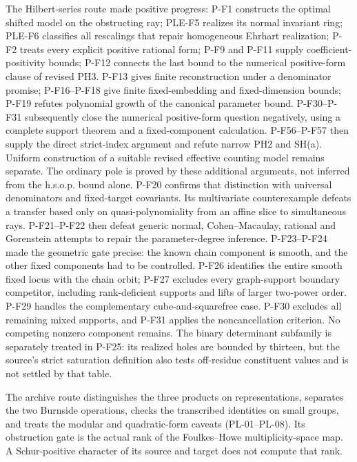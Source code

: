 The Hilbert-series route made positive progress: P-F1 constructs the
optimal shifted model on the obstructing ray; PLE-F5 realizes its normal
invariant ring; PLE-F6 classifies all rescalings that repair homogeneous
Ehrhart realization; P-F2 treats every explicit positive rational form;
P-F9 and P-F11 supply coefficient-positivity bounds; P-F12 connects the
last bound to the numerical positive-form clause of revised PH3.
P-F13 gives finite reconstruction under a denominator promise;
P-F16--P-F18 give finite fixed-embedding and fixed-dimension bounds;
P-F19 refutes polynomial growth of the canonical parameter bound.
P-F30--P-F31 subsequently close the numerical positive-form question
negatively, using a complete support theorem and a fixed-component
calculation. P-F56--P-F57 then supply the direct strict-index
argument and refute narrow PH2 and SH(a). Uniform construction
of a suitable revised effective counting model remains separate.
The ordinary pole is proved by these additional arguments, not
inferred from the h.s.o.p. bound alone.
P-F20 confirms that distinction with universal denominators and
fixed-target covariants. Its multivariate counterexample defeats a
transfer based only on quasi-polynomiality from an affine slice to
simultaneous rays. P-F21--P-F22 then defeat generic normal,
Cohen--Macaulay, rational and Gorenstein attempts to repair the
parameter-degree inference. P-F23--P-F24 made the geometric gate precise: the known chain
component is smooth, and the other fixed components had to be
controlled. P-F26 identifies the entire smooth fixed locus with
the chain orbit; P-F27 excludes every graph-support boundary
competitor, including rank-deficient supports and lifts of larger
two-power order. P-F29 handles the complementary cube-and-squarefree
case. P-F30 excludes all remaining mixed supports, and P-F31 applies
the noncancellation criterion. No competing nonzero component remains. The binary determinant subfamily is separately treated
in P-F25: its realized holes are bounded by thirteen, but the
source's strict saturation definition also tests off-residue
constituent values and is not settled by that table.

The archive route distinguishes the three products on representations,
separates the two Burnside operations, checks the transcribed identities
on small groups, and treats the modular and quadratic-form caveats
(PL-01--PL-08). Its obstruction gate is the actual rank of the
Foulkes--Howe multiplicity-space map. A Schur-positive character of its
source and target does not compute that rank.

